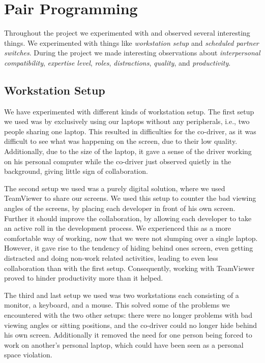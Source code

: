 \section{Pair Programming}
Throughout the project we experimented with and observed several interesting things.
We experimented with things like \textit{workstation setup} and \textit{scheduled partner switches}.
During the project we made interesting observations about \textit{interpersonal compatibility}, \textit{expertise level}, \textit{roles}, \textit{distractions}, \textit{quality}, and \textit{productivity}.

\subsection{Workstation Setup}
We have experimented with different kinds of workstation setup.
The first setup we used was by exclusively using our laptops without any peripherals, i.e., two people sharing one laptop.
This resulted in difficulties for the co-driver, as it was difficult to see what was happening on the screen, due to their low quality.
Additionally, due to the size of the laptop, it gave a sense of the driver working on his personal computer while the co-driver just observed quietly in the background, giving little sign of collaboration.



The second setup we used was a purely digital solution, where we used TeamViewer to share our screens.
We used this setup to counter the bad viewing angles of the screens, by placing each developer in front of his own screen.
Further it should improve the collaboration, by allowing each developer to take an active roll in the development process.
We experienced this as a more comfortable way of working, now that we were not slumping over a single laptop.
However, it gave rise to the tendency of hiding behind ones screen, even getting distracted and doing non-work related activities, leading to even less collaboration than with the first setup.
Consequently, working with TeamViewer proved to hinder productivity more than it helped.




The third and last setup we used was two workstations each consisting of a monitor, a keyboard, and a mouse.
This solved some of the problems we encountered with the two other setups: there were no longer problems with bad viewing angles or sitting positions, and the co-driver could no longer hide behind his own screen.
Additionally it removed the need for one person being forced to work on another's personal laptop, which could have been seen as a personal space violation.

